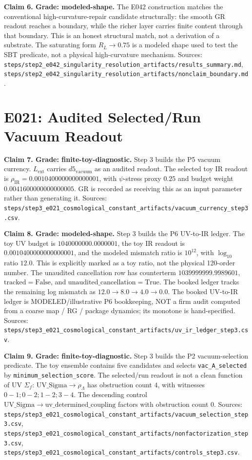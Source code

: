 \documentclass[11pt]{article}
\begin{document}
\textbf{Claim 6. Grade: modeled-shape.}
The E042 construction matches the conventional high-curvature-repair candidate structurally: the smooth GR readout reaches a boundary, while the richer layer carries finite content through that boundary. This is an honest structural match, not a derivation of a substrate. The saturating form \(R_L \to 0.75\) is a modeled shape used to test the SBT predicate, not a physical high-curvature mechanism.
Sources: \texttt{steps/step2\_e042\_singularity\_resolution\_artifacts/results\_summary.md}, \texttt{steps/step2\_e042\_singularity\_resolution\_artifacts/nonclaim\_boundary.md}.

\section{E021: Audited Selected/Run Vacuum Readout}

\textbf{Claim 7. Grade: finite-toy-diagnostic.}
Step 3 builds the P5 vacuum currency. \(L_{\mathrm{ext}}\) carries \(d5_{\mathrm{vacuum}}\) as an audited readout. The selected toy IR readout is \(\rho_{\mathrm{IR}}=0.0010400000000000001\), with \( \psi \)-stress proxy \(0.25\) and budget weight \(0.0041600000000000005\). GR is recorded as receiving this as an input parameter rather than generating it.
Sources: \texttt{steps/step3\_e021\_cosmological\_constant\_artifacts/vacuum\_currency\_step3.csv}.

\textbf{Claim 8. Grade: modeled-shape.}
Step 3 builds the P6 UV-to-IR ledger. The toy UV budget is \(1040000000.0000001\), the toy IR readout is \(0.0010400000000000001\), and the modeled mismatch ratio is \(10^{12}\), with \(\log_{10}\) ratio \(12.0\). This is explicitly marked as a toy ratio, not the physical 120-order number. The unaudited cancellation row has counterterm \(1039999999.9989601\), \(\mathrm{tracked}=\mathrm{False}\), and \(\mathrm{unaudited\_cancellation}=\mathrm{True}\). The booked ledger tracks the remaining log mismatch as \(12.0 \to 8.0 \to 4.0 \to 0.0\).
The booked UV-to-IR ledger is MODELED/illustrative P6 bookkeeping, NOT a firm audit computed from a coarse map / RG / package dynamics; its monotone is hand-specified.
Sources: \texttt{steps/step3\_e021\_cosmological\_constant\_artifacts/uv\_ir\_ledger\_step3.csv}.

\textbf{Claim 9. Grade: finite-toy-diagnostic.}
Step 3 builds the P2 vacuum-selection predicate. The toy ensemble contains five candidates and selects \texttt{vac\_A\_selected} by \texttt{minimum\_selection\_score}. The selected/run readout is not a clean function of UV \(\Sigma_f\): \(\mathrm{UV\_Sigma}\to\rho_\Lambda\) has obstruction count \(4\), with witnesses \(0\!-\!1;0\!-\!2;1\!-\!2;3\!-\!4\). The descending control \(\mathrm{UV\_Sigma}\to\mathrm{uv\_determined\_coupling}\) factors with obstruction count \(0\).
Sources: \texttt{steps/step3\_e021\_cosmological\_constant\_artifacts/vacuum\_selection\_step3.csv}, \texttt{steps/step3\_e021\_cosmological\_constant\_artifacts/nonfactorization\_step3.csv}, \texttt{steps/step3\_e021\_cosmological\_constant\_artifacts/controls\_step3.csv}.
\end{document}
